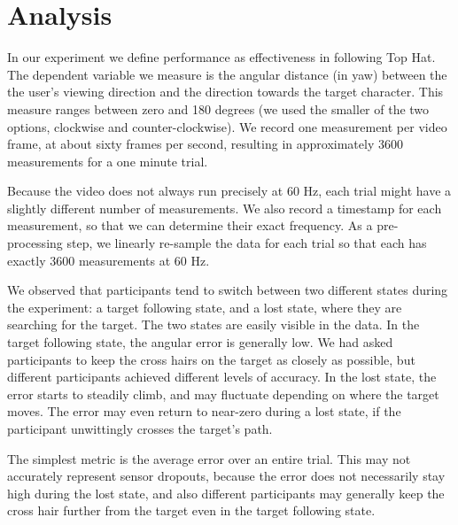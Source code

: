 \documentclass{acmsiggraph}                     %
\begin{document}
\section{Analysis}

In our experiment we define performance as effectiveness in following Top Hat.  The dependent variable we measure is the angular distance (in yaw) between the the user's viewing direction and the direction towards the target character.  This measure ranges between zero and 180 degrees (we used the smaller of the two options, clockwise and counter-clockwise).  We record one measurement per video frame, at about sixty frames per second, resulting in approximately 3600 measurements for a one minute trial.

Because the video does not always run precisely at 60 Hz, each trial might have a slightly different number of measurements.  We also record a timestamp for each measurement, so that we can determine their exact frequency.  As a pre-processing step, we linearly re-sample the data for each trial so that each has exactly 3600 measurements at 60 Hz.

We observed that participants tend to switch between two different states during the experiment: a target following state, and a lost state, where they are searching for the target.  The two states are easily visible in the data.  In the target following state, the angular error is generally low.  We had asked participants to keep the cross hairs on the target as closely as possible, but different participants achieved different levels of accuracy.  In the lost state, the error starts to steadily climb, and may fluctuate depending on where the target moves.  The error may even return to near-zero during a lost state, if the participant unwittingly crosses the target's path.



The simplest metric is the average error over an entire trial.  This may not accurately represent sensor dropouts, because the error does not necessarily stay high during the lost state, and also different participants may generally keep the cross hair further from the target even in the target following state.
\end{document}
